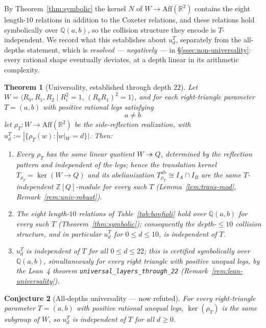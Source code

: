 \documentclass[11pt,a4paper]{article}
\newtheorem{theorem}{Theorem}
\newtheorem{conjecture}[theorem]{Conjecture}
\theoremstyle{remark}
\theoremstyle{plain}
\begin{document}
By Theorem~\ref{thm:symbolic} the kernel $N$ of $W \to \mathrm{Aff}(\mathbb{R}^2)$
contains the eight length-$10$ relations in addition to the Coxeter
relations, and these relations hold symbolically over $\mathbb{Q}(a, b)$,
so the collision structure they encode is $T$-independent.  We record
what this establishes about $u_d^T$, separately from the all-depths
statement, which is \emph{resolved --- negatively --- } in
\S\ref{ssec:non-universality}: every rational shape eventually
deviates, at a depth linear in its arithmetic complexity.

\begin{theorem}[Universality, established through depth $22$]
\label{thm:universality}
Let $W = \langle R_0, R_1, R_2 \mid R_i^2 = 1,\, (R_0 R_1)^2 = 1\rangle$,
and for each right-triangle parameter $T = (a, b)$ with positive rational legs satisfying
\[
\boxed{\,a \ne b\,}
\]
let $\rho_T : W \to \mathrm{Aff}(\mathbb{R}^2)$ be the side-reflection
realization, with $u_d^T := |\{\rho_T(w) : |w|_W = d\}|$.  Then:
\begin{enumerate}[label=\textup{(\roman*)},leftmargin=*,itemsep=0.1em]
\item Every $\rho_T$ has the \emph{same} linear quotient
$W \twoheadrightarrow Q$, determined by the reflection pattern and
independent of the legs; hence the translation kernel
$T_{\rho_T} = \ker(W \to Q)$ and its abelianization
$T_{\rho_T}^{\mathrm{ab}} \cong I_A \cap I_B$ are the same $T$-independent
$\mathbb{Z}[Q]$-module for every such $T$
(Lemma~\ref{lem:trans-mod}, Remark~\ref{rem:univ-robust}).
\item The eight length-$10$ relations of Table~\ref{tab:bonfioli} hold
over $\mathbb{Q}(a, b)$ for every such $T$ (Theorem~\ref{thm:symbolic});
consequently the depth-$\le 10$ collision structure, and in particular
$u_d^T$ for $0 \le d \le 10$, is independent of $T$.
\item $u_d^T$ is independent of $T$ for all $0 \le d \le 22$; this is
certified symbolically over $\mathbb{Q}(a, b)$, simultaneously for every
right triangle with positive unequal legs, by the Lean~4 theorem
\texttt{universal\_layers\_through\_22}
(Remark~\ref{rem:lean-universality}).
\end{enumerate}
\end{theorem}

\begin{conjecture}[All-depths universality --- now refuted]
\label{conj:universality}
For every right-triangle parameter $T = (a, b)$ with positive rational
unequal legs, $\ker(\rho_T)$ is the same subgroup of $W$, so $u_d^T$ is
independent of $T$ for \emph{all} $d \ge 0$.
\end{conjecture}
\end{document}
